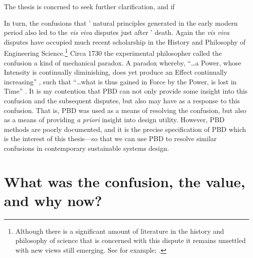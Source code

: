\documentclass[a4paper, 12pt]{article}
\begin{document}
The thesis is concrned to seek further clarification, and if 

In turn, the confusions that \citeauthor{descartes_principles_1982}' natural principles generated in the early modern period also led to the \textit{vis viva} disputes just after \citeauthor{descartes_principles_1982}' death. Again the \textit{vis viva} disputes have occupied much recent scholarship in the History and Philosophy of Engineering Science.\footnote{Although there is a significant amount of literature in the history and philosophy of science that is concerned with this dispute it remains unsettled with new views still emerging. See for example; \citet{hankins_eighteenth-century_1965, cardwell_factors_1967, iltis_controversy_1967, iltis_alembert_1970, iltis_leibniz_1971, iltis_leibnizian-newtonian_1973, gale_leibniz_1973, laudan_vis_1968-4, smith_vis_2006, hepburn_euler_2010, shimony_leibniz_2010a, reichenberger_leibnizs_2012, morris_john_2018-1}.} Circa 1730 the experimental philosopher \citeauthor{desaguliers_course_1734} called the confusion a kind of mechanical paradox. A paradox whereby, ``\dots a Power, whose Intensity is continually diminishing, does yet produce an Effect continually increasing'' \citeyearpar[my edit, p.~454]{desaguliers_course_1734}, such that ``\dots what is thus gained in Force by the Power, is lost in Time'' \citep[my edit, p.~518]{desaguliers_course_1734}. It is my contention that PBD can not only provide some insight into this confusion and the subsequent disputes, but also may have  as a response to this confusion. That is, PBD was used as a means of resolving the confusion, but also as a means of providing \textit{a priori} insight into design utility. However, PBD methods are poorly documented, and it is the precise specification of PBD which is the interest of this thesis---so that we can use PBD to resolve similar confusions in contemporary sustainable systems design. 

\section{What was the confusion, the value, and why now?} 
\label{sec:how:confusion}
\end{document}
